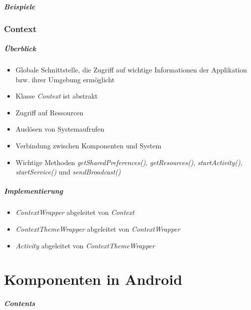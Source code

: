 \begin{frame}
   \frametitle{Beispiele}

   
   
   
\end{frame}

\section{Context}
\begin{frame}
   \frametitle{Überblick}
   \begin{itemize}
      \item Globale Schnittstelle, die Zugriff auf wichtige Informationen der 
      	Applikation bzw. ihrer Umgebung ermöglicht
      \item Klasse \emph{Context} ist abstrakt
      \item Zugriff auf Ressourcen
      \item Auslösen von Systemaufrufen
      \item Verbindung zwischen Komponenten und System
      \item Wichtige Methoden \emph{getSharedPreferences()}, \emph{getResources()}, 
      	\emph{startActivity()}, \emph{startService()} und \emph{sendBroadcast()}
   \end{itemize}
\end{frame}

\begin{frame}
   \frametitle{Implementierung}
   \begin{itemize}
      \item \emph{ContextWrapper} abgeleitet von \emph{Context}
      \item \emph{ContextThemeWrapper} abgeleitet von \emph{ContextWrapper}
      \item \emph{Activity} abgeleitet von \emph{ContextThemeWrapper}
   \end{itemize}
\end{frame}

\part{Komponenten in Android}
\frame{\partpage}
\begin{frame}
	\frametitle{Contents}
	\tableofcontents[]
\end{frame}

